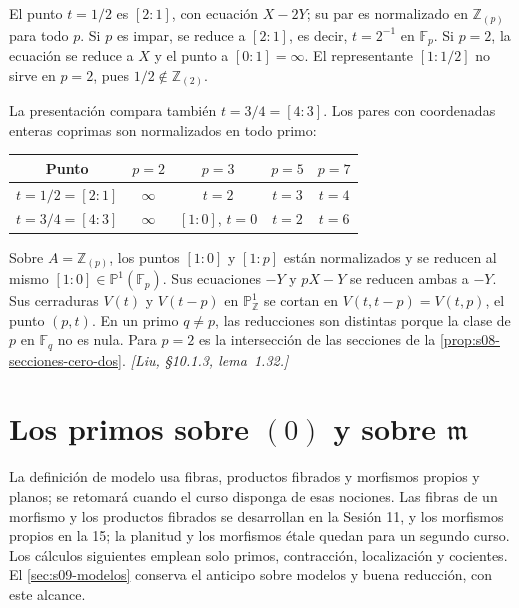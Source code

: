 \begin{ejem}
\label{ejem:s09-reduccion-medio}
El punto $t=1/2$ es $[2:1]$, con ecuación $X-2Y$; su par es normalizado en $\mathbb Z_{(p)}$ para todo $p$. Si $p$ es impar, se reduce a $[2:1]$, es decir, $t=2^{-1}$ en $\mathbb F_p$. Si $p=2$, la ecuación se reduce a $X$ y el punto a $[0:1]=\infty$. El representante $[1:1/2]$ no sirve en $p=2$, pues $1/2\notin\mathbb Z_{(2)}$.

La presentación compara también $t=3/4=[4:3]$. Los pares con coordenadas enteras coprimas son normalizados en todo primo:
\begin{center}
\small
\renewcommand{\arraystretch}{1.2}
\begin{tabular}{ccccc}
\hline
Punto & $p=2$ & $p=3$ & $p=5$ & $p=7$\\
\hline
$t=1/2=[2:1]$ & $\infty$ & $t=2$ & $t=3$ & $t=4$\\
$t=3/4=[4:3]$ & $\infty$ & $[1:0]$, $t=0$ & $t=2$ & $t=6$\\
\hline
\end{tabular}
\end{center}
\end{ejem}

\begin{ejem}[Dos puntos con la misma reducción, $t=0$ y $t=p$]
\label{ejem:s09-misma-reduccion}
Sobre $A=\mathbb Z_{(p)}$, los puntos $[1:0]$ y $[1:p]$ están normalizados y se reducen al mismo $[1:0]\in\mathbb P^1(\mathbb F_p)$. Sus ecuaciones $-Y$ y $pX-Y$ se reducen ambas a $-Y$. Sus cerraduras $V(t)$ y $V(t-p)$ en $\mathbb P^1_{\mathbb Z}$ se cortan en $V(t,t-p)=V(t,p)$, el punto $(p,t)$. En un primo $q\ne p$, las reducciones son distintas porque la clase de $p$ en $\mathbb F_q$ no es nula. Para $p=2$ es la intersección de las secciones de la \cref{prop:s08-secciones-cero-dos}. \emph{[Liu, \S10.1.3, lema~1.32.]}
\end{ejem}

\section{Los primos sobre \texorpdfstring{$(0)$ y sobre $\mathfrak m$}{(0) y sobre m}}
\label{sec:s09-primos-sobre-base}

\begin{obs}
\label{obs:s09-lo-que-se-aplaza}
La definición de modelo usa fibras, productos fibrados y morfismos propios y planos; se retomará cuando el curso disponga de esas nociones. Las fibras de un morfismo y los productos fibrados se desarrollan en la Sesión 11, y los morfismos propios en la 15; la planitud y los morfismos étale quedan para un segundo curso. Los cálculos siguientes emplean solo primos, contracción, localización y cocientes. El \cref{sec:s09-modelos} conserva el anticipo sobre modelos y buena reducción, con este alcance.
\end{obs}


